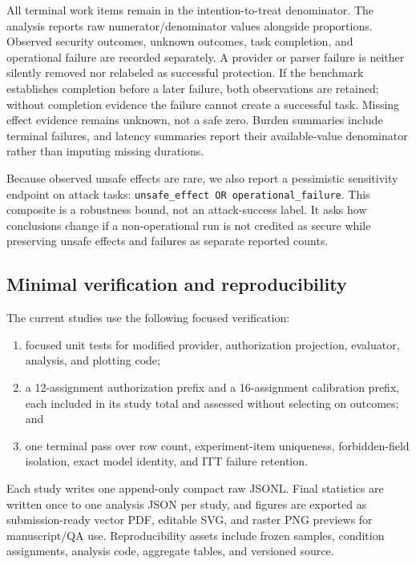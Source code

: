 All terminal work items remain in the intention-to-treat denominator. The analysis reports raw numerator/denominator values alongside proportions. Observed security outcomes, unknown outcomes, task completion, and operational failure are recorded separately. A provider or parser failure is neither silently removed nor relabeled as successful protection. If the benchmark establishes completion before a later failure, both observations are retained; without completion evidence the failure cannot create a successful task. Missing effect evidence remains unknown, not a safe zero. Burden summaries include terminal failures, and latency summaries report their available-value denominator rather than imputing missing durations.

Because observed unsafe effects are rare, we also report a pessimistic sensitivity endpoint on attack tasks: \nolinkurl{unsafe_effect OR operational_failure}. This composite is a robustness bound, not an attack-success label. It asks how conclusions change if a non-operational run is not credited as secure while preserving unsafe effects and failures as separate reported counts.

\subsection{Minimal verification and reproducibility}

\label{sec:methods-minimal-verification-and-reproducibility}

The current studies use the following focused verification:

\begin{enumerate}

\item focused unit tests for modified provider, authorization projection, evaluator, analysis, and plotting code;

\item a 12-assignment authorization prefix and a 16-assignment calibration prefix, each included in its study total and assessed without selecting on outcomes; and

\item one terminal pass over row count, experiment-item uniqueness, forbidden-field isolation, exact model identity, and ITT failure retention.

\end{enumerate}

Each study writes one append-only compact raw JSONL. Final statistics are written once to one analysis JSON per study, and figures are exported as submission-ready vector PDF, editable SVG, and raster PNG previews for manuscript/QA use. Reproducibility assets include frozen samples, condition assignments, analysis code, aggregate tables, and versioned source.
